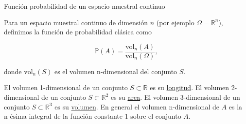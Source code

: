 \documentclass{beamer}
\begin{document}
\begin{frame}{Funci\'on  probabilidad de un espacio muestral continuo}
\small{Para un espacio muestral continuo de dimensi\'on $n$ (por ejemplo $\Omega = \mathbb{R}^n$), definimos la funci\'on de probabilidad cl\'asica como
 
 
 \[
 \mathbb{P}(A)=\frac{\text{vol}_n(A)}{\text{vol}_n(\Omega)},
 \]
 
 donde $\text{vol}_n(S)$ es el volumen n-dimensional del conjunto $S$. }
 
 \vspace{0.2cm}
 
 \scriptsize{El volumen 1-dimensional de un conjunto $S\subset \mathbb{R}$ es su \underline{longitud}. El volumen 2-dimensional de un conjunto $S\subset \mathbb{R}^2$ es su \underline{area}.  El volumen 3-dimensional de un conjunto $ S \subset \mathbb{R}^3$ es su \underline{volumen}. En general el volumen n-dimensional de $A$ es la n-\'esima integral de la funci\'on constante $1$ sobre el conjunto $A$.}
\end{frame}
\end{document}
